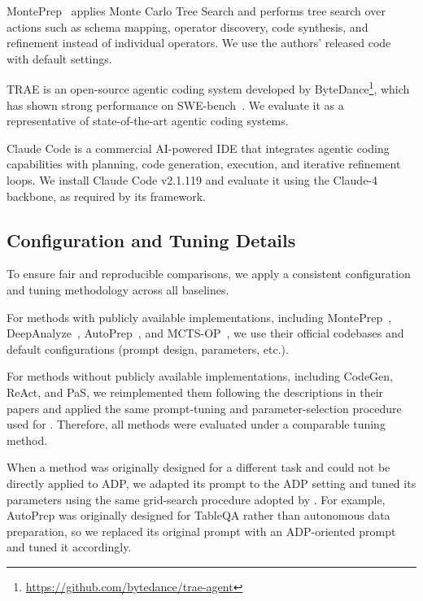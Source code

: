 MontePrep~\cite{ge2025monteprep} applies Monte Carlo Tree Search and performs tree search over actions such as schema mapping, operator discovery, code synthesis, and refinement instead of individual operators. We use the authors' released code with default settings.

TRAE is an open-source agentic coding system developed by ByteDance\footnote{\url{https://github.com/bytedance/trae-agent}}, which has shown strong performance on SWE-bench~\cite{jimenez2024swe}. We evaluate it as a representative of state-of-the-art agentic coding systems.

Claude Code is a commercial AI-powered IDE that integrates agentic coding capabilities with planning, code generation, execution, and iterative refinement loops. We install Claude Code v2.1.119 and evaluate it using the Claude-4 backbone, as required by its framework.

\subsection{Configuration and Tuning Details}
\label{subsec:appendix_baseline_config}

To ensure fair and reproducible comparisons, we apply a consistent configuration and tuning methodology across all baselines.

For methods with publicly available implementations, including MontePrep~\cite{ge2025monteprep}, DeepAnalyze~\cite{zhang2025deepanalyze}, AutoPrep~\cite{fan2024autoprep}, and MCTS-OP~\cite{li2025alphasql}, we use their official codebases and default configurations (\eg prompt design, parameters, etc.).

For methods without publicly available implementations, including CodeGen, ReAct, and PaS, we reimplemented them following the descriptions in their papers and applied the same prompt-tuning and parameter-selection procedure used for \sys. Therefore, all methods were evaluated under a comparable tuning method.

When a method was originally designed for a different task and could not be directly applied to ADP, we adapted its prompt to the ADP setting and tuned its parameters using the same grid-search procedure adopted by \sys. For example, AutoPrep was originally designed for TableQA rather than autonomous data preparation, so we replaced its original prompt with an ADP-oriented prompt and tuned it accordingly.

